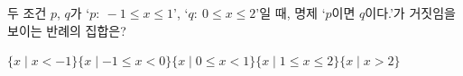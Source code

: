 두 조건 $p$, $q$가 `$p:\ -1\le x\le 1$', `$q:\ 0\le x\le 2$'일 때, 명제 `$p$이면 $q$이다.'가 거짓임을 보이는 반례의 집합은?
\begin{choicesii}{$\{x \mid x<-1\}$}{$\{x \mid -1\le x<0\}$}{$\{x \mid 0\le x<1\}$}{$\{x \mid 1\le x\le 2\}$}{$\{x \mid x>2\}$}\end{choicesii}
